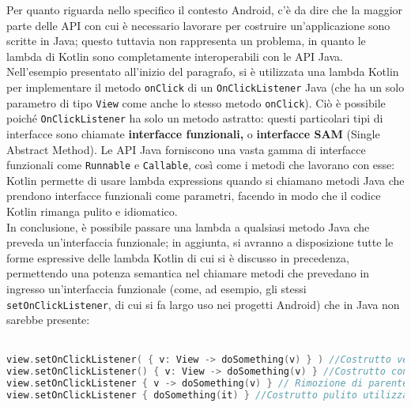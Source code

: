 Per quanto riguarda nello specifico il contesto Android, c'è da dire che la maggior parte delle API con cui è necessario lavorare per costruire un'applicazione sono scritte in Java; questo tuttavia non rappresenta un problema, in quanto le lambda di Kotlin sono completamente interoperabili con le API Java. Nell'esempio presentato all'inizio del paragrafo, si è utilizzata una lambda Kotlin per implementare il metodo \texttt{onClick} di un \texttt{OnClickListener} Java (che ha un solo parametro di tipo \texttt{View} come anche lo stesso metodo \texttt{onClick}).  Ciò è possibile poiché \texttt{OnClickListener} ha solo un metodo astratto: questi particolari tipi di interfacce sono chiamate {\bfseries interfacce funzionali,} o {\bfseries interfacce SAM} (Single Abstract Method). Le API Java forniscono una vasta gamma di interfacce funzionali come \texttt{Runnable} e \texttt{Callable}, così come i metodi che lavorano con esse: Kotlin permette di usare lambda expressions quando si chiamano metodi Java che prendono interfacce funzionali come parametri, facendo in modo che il codice Kotlin rimanga pulito e idiomatico.\\
In conclusione, è possibile passare una lambda a qualsiasi metodo Java che preveda un'interfaccia funzionale; in aggiunta, si avranno a disposizione tutte le forme espressive delle lambda Kotlin di cui si è discusso in precedenza, permettendo una potenza semantica nel chiamare metodi che prevedano in ingresso un'interfaccia funzionale (come, ad esempio, gli stessi \texttt{setOnClickListener}, di cui si fa largo uso nei progetti Android) che in Java non sarebbe presente:\\
\\

\begin{lstlisting}[caption={Definizione di OnClickListener con le varie forme espressive di Kotlin}, captionpos=b, label={lst:exAmpleLambdaList}, language=Kotlin]
view.setOnClickListener( { v: View -> doSomething(v) } ) //Costrutto verboso
view.setOnClickListener() { v: View -> doSomething(v) } //Costrutto con parentesi tonde
view.setOnClickListener { v -> doSomething(v) } // Rimozione di parentesi e tipo
view.setOnClickListener { doSomething(it) } //Costrutto pulito utilizzando "it"
\end{lstlisting}

